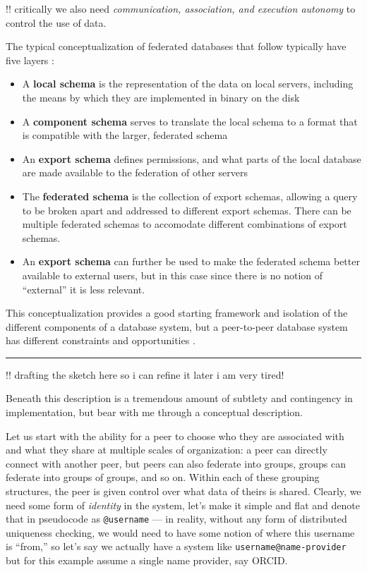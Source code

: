 \documentclass[11pt]{article}
\begin{document}
\begin{multicols}{2}
!! critically we also need \emph{communication, association, and
execution autonomy} to control the use of data.

The typical conceptualization of federated databases that follow
typically have five layers \cite{shethFederatedDatabaseSystems1990} :

\begin{itemize}

\item
  A \textbf{local schema} is the representation of the data on local
  servers, including the means by which they are implemented in binary
  on the disk
\item
  A \textbf{component schema} serves to translate the local schema to a
  format that is compatible with the larger, federated schema
\item
  An \textbf{export schema} defines permissions, and what parts of the
  local database are made available to the federation of other servers
\item
  The \textbf{federated schema} is the collection of export schemas,
  allowing a query to be broken apart and addressed to different export
  schemas. There can be multiple federated schemas to accomodate
  different combinations of export schemas.
\item
  An \textbf{export schema} can further be used to make the federated
  schema better available to external users, but in this case since
  there is no notion of ``external'' it is less relevant.
\end{itemize}

This conceptualization provides a good starting framework and isolation
of the different components of a database system, but a peer-to-peer
database system has different constraints and opportunities \cite{bonifatiDistributedDatabasesPeertopeer2008} .

\begin{center}\rule{0.5\linewidth}{0.5pt}\end{center}

!! drafting the sketch here so i can refine it later i am very tired!

Beneath this description is a tremendous amount of subtlety and
contingency in implementation, but bear with me through a conceptual
description.

Let us start with the ability for a peer to choose who they are
associated with and what they share at multiple scales of organization:
a peer can directly connect with another peer, but peers can also
federate into groups, groups can federate into groups of groups, and so
on. Within each of these grouping structures, the peer is given control
over what data of theirs is shared. Clearly, we need some form of
\emph{identity} in the system, let's make it simple and flat and denote
that in pseudocode as \texttt{@username} --- in reality, without any
form of distributed uniqueness checking, we would need to have some
notion of where this username is ``from,'' so let's say we actually have
a system like \texttt{username@name-provider} but for this example
assume a single name provider, say ORCID.


\end{multicols}
\end{document}
